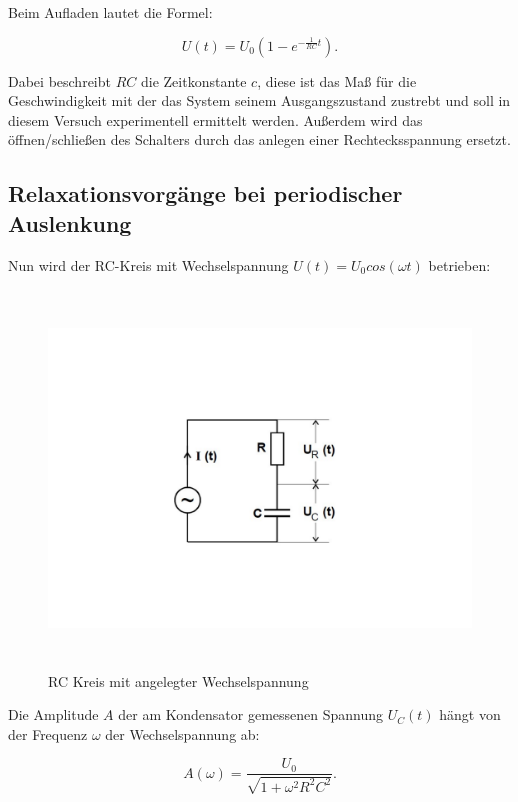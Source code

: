 Beim Aufladen lautet die Formel:

\begin{equation}
    U(t)= U_{0}(1-e^{-\frac{1}{RC}t}) . \label{eqn:Aufladen}
\end{equation}

Dabei beschreibt $RC$ die Zeitkonstante $c$, diese ist das Maß für die Geschwindigkeit mit der das System seinem
Ausgangszustand zustrebt und soll in diesem Versuch experimentell ermittelt werden.
Außerdem wird das öffnen/schließen des Schalters durch das anlegen einer Rechtecksspannung ersetzt.

\subsection{Relaxationsvorgänge bei periodischer Auslenkung}
Nun wird der RC-Kreis mit Wechselspannung $U(t) = U_{0}cos(\omega t)$ betrieben:
\begin{figure}
    \centering
    \includegraphics[height=10cm]{content/Theorie - RC-Kreis Wechselspannung.pdf}
    \caption{RC Kreis mit angelegter Wechselspannung \cite{v353}}
    \label{fig:Theorie - RC_Kreis Wechselspannung}
\end{figure}

Die Amplitude $A$ der am Kondensator gemessenen Spannung $U_{C}(t)$ hängt von der Frequenz $\omega$ der Wechselspannung ab:

\begin{equation}
    A(\omega)= \frac{U_{0}}{\sqrt{1+\omega ^{2}R^{2}C^{2}}} . \label{eqn:Tiefpass}
\end{equation}

